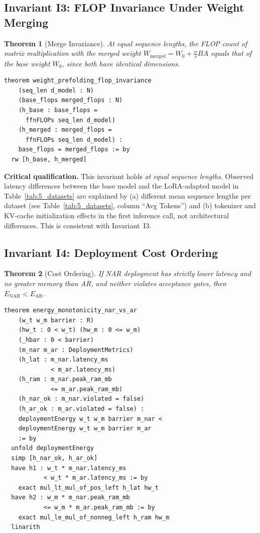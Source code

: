 \documentclass[10pt,journal,compsoc]{IEEEtran}
\newtheorem{theorem}{Theorem}
\theoremstyle{remark}
\begin{document}
\subsection{Invariant I3: FLOP Invariance Under Weight Merging}

\begin{theorem}[Merge Invariance]
\label{thm:I3}
At equal sequence lengths, the FLOP count of matrix multiplication with the merged weight $W_\text{merged} = W_0 + \frac{\alpha}{r}BA$ equals that of the base weight $W_0$, since both have identical dimensions.
\end{theorem}

\begin{lstlisting}[caption={Invariant I3 in Lean 4}]
theorem weight_prefolding_flop_invariance
    (seq_len d_model : N)
    (base_flops merged_flops : N)
    (h_base : base_flops =
      ffnFLOPs seq_len d_model)
    (h_merged : merged_flops =
      ffnFLOPs seq_len d_model) :
    base_flops = merged_flops := by
  rw [h_base, h_merged]
\end{lstlisting}

\textbf{Critical qualification.} This invariant holds \emph{at equal sequence lengths}. Observed latency differences between the base model and the LoRA-adapted model in Table~\ref{tab:5_datasets} are explained by (a) different mean sequence lengths per dataset (see Table~\ref{tab:5_datasets}, column ``Avg Tokens'') and (b) tokenizer and KV-cache initialization effects in the first inference call, not architectural differences. This is consistent with Invariant~I3.

\subsection{Invariant I4: Deployment Cost Ordering}

\begin{theorem}[Cost Ordering]
\label{thm:I4}
If NAR deployment has strictly lower latency and no greater memory than AR, and neither violates acceptance gates, then $E_\text{NAR} < E_\text{AR}$.
\end{theorem}

\begin{lstlisting}[caption={Invariant I4 in Lean 4}]
theorem energy_monotonicity_nar_vs_ar
    (w_t w_m barrier : R)
    (hw_t : 0 < w_t) (hw_m : 0 <= w_m)
    (_hbar : 0 < barrier)
    (m_nar m_ar : DeploymentMetrics)
    (h_lat : m_nar.latency_ms
             < m_ar.latency_ms)
    (h_ram : m_nar.peak_ram_mb
             <= m_ar.peak_ram_mb)
    (h_nar_ok : m_nar.violated = false)
    (h_ar_ok : m_ar.violated = false) :
    deploymentEnergy w_t w_m barrier m_nar <
    deploymentEnergy w_t w_m barrier m_ar
    := by
  unfold deploymentEnergy
  simp [h_nar_ok, h_ar_ok]
  have h1 : w_t * m_nar.latency_ms
           < w_t * m_ar.latency_ms := by
    exact mul_lt_mul_of_pos_left h_lat hw_t
  have h2 : w_m * m_nar.peak_ram_mb
           <= w_m * m_ar.peak_ram_mb := by
    exact mul_le_mul_of_nonneg_left h_ram hw_m
  linarith
\end{lstlisting}
\end{document}
